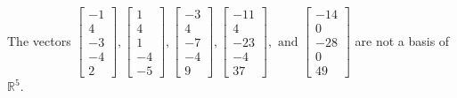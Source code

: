\begin{exercise}
\begin{exerciseStatement}
  \end{exerciseStatement}
  \begin{exerciseAnswer}
   The vectors \(\left[\begin{array}{r}
-1 \\
4 \\
-3 \\
-4 \\
2
\end{array}\right] , \left[\begin{array}{r}
1 \\
4 \\
1 \\
-4 \\
-5
\end{array}\right] , \left[\begin{array}{r}
-3 \\
4 \\
-7 \\
-4 \\
9
\end{array}\right] , \left[\begin{array}{r}
-11 \\
4 \\
-23 \\
-4 \\
37
\end{array}\right] , \text{ and } \left[\begin{array}{r}
-14 \\
0 \\
-28 \\
0 \\
49
\end{array}\right]\) 
  	 are not  a basis of \(\mathbb{R}^5\).
  


  \end{exerciseAnswer}
\end{exercise}